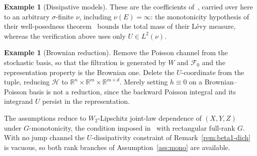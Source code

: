\documentclass[preprint,12pt]{elsarticle}
\newcommand{\R}{\mathbb{R}}
\newcommand{\F}{\mathcal{F}}
\newcommand{\Lnu}{L^2(\nu)}
\numberwithin{equation}{section}
\theoremstyle{plain}
\theoremstyle{definition}
\theoremstyle{\PaperRemarkStyle}
\newtheorem{example}[theorem]{Example}
\begin{document}
\begin{example}[Dissipative models]
These are the coefficients of~\cite[Example~3.1]{LiMin}, carried over here to an
arbitrary $\sigma$-finite $\nu$, including $\nu(E)=\infty$: the monotonicity hypothesis of
their well-posedness theorem~\cite[(H3.2) and Theorem~3.1]{LiMin} bounds the total mass of
their L\'evy measure, whereas the verification above uses only $U\in\Lnu$.

\end{example}

\begin{example}[Brownian reduction]\label{ex:brownian}
Remove the Poisson channel from the stochastic basis, so that the filtration is generated by
$W$ and $\F_0$ and the representation property is the Brownian one. Delete the $U$-coordinate
from the tuple, reducing $\mathcal H$ to $\R^n\times\R^m\times\R^{m\times d}$. Merely setting
$h\equiv0$ on a Brownian--Poisson basis is not a reduction, since the backward Poisson integral
and its integrand $U$ persist in the representation.

The assumptions reduce to $W_2$-Lipschitz joint-law dependence of $(X,Y,Z)$ under
$G$-monotonicity, the condition imposed in~\cite[(A1)]{BYZ} with rectangular full-rank $G$.
With no jump channel the $U$-dissipativity constraint of
Remark~\ref{rem:beta1-dich} is vacuous, so both rank branches of Assumption~\ref{ass:mono}
are available.
\end{example}
\end{document}

